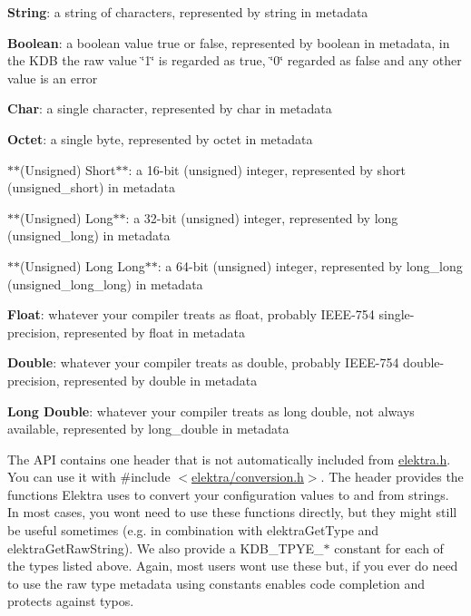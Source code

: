 \begin{DoxyItemize}
\item {\bfseries{String}}\+: a string of characters, represented by {\ttfamily string} in metadata
\item {\bfseries{Boolean}}\+: a boolean value {\ttfamily true} or {\ttfamily false}, represented by {\ttfamily boolean} in metadata, in the K\+DB the raw value {\ttfamily \char`\"{}1\char`\"{}} is regarded as true, {\ttfamily \char`\"{}0\char`\"{}} regarded as false and any other value is an error
\item {\bfseries{Char}}\+: a single character, represented by {\ttfamily char} in metadata
\item {\bfseries{Octet}}\+: a single byte, represented by {\ttfamily octet} in metadata
\item $\ast$$\ast$(Unsigned) Short$\ast$$\ast$\+: a 16-\/bit (unsigned) integer, represented by {\ttfamily short} ({\ttfamily unsigned\+\_\+short}) in metadata
\item $\ast$$\ast$(Unsigned) Long$\ast$$\ast$\+: a 32-\/bit (unsigned) integer, represented by {\ttfamily long} ({\ttfamily unsigned\+\_\+long}) in metadata
\item $\ast$$\ast$(Unsigned) Long Long$\ast$$\ast$\+: a 64-\/bit (unsigned) integer, represented by {\ttfamily long\+\_\+long} ({\ttfamily unsigned\+\_\+long\+\_\+long}) in metadata
\item {\bfseries{Float}}\+: whatever your compiler treats as {\ttfamily float}, probably I\+E\+E\+E-\/754 single-\/precision, represented by {\ttfamily float} in metadata
\item {\bfseries{Double}}\+: whatever your compiler treats as {\ttfamily double}, probably I\+E\+E\+E-\/754 double-\/precision, represented by {\ttfamily double} in metadata
\item {\bfseries{Long Double}}\+: whatever your compiler treats as {\ttfamily long double}, not always available, represented by {\ttfamily long\+\_\+double} in metadata
\end{DoxyItemize}

The A\+PI contains one header that is not automatically included from {\ttfamily \mbox{\hyperlink{elektra_8h}{elektra.\+h}}}. You can use it with {\ttfamily \#include $<$\mbox{\hyperlink{conversion_8h}{elektra/conversion.\+h}}$>$}. The header provides the functions Elektra uses to convert your configuration values to and from strings. In most cases, you won\textquotesingle{}t need to use these functions directly, but they might still be useful sometimes (e.\+g. in combination with {\ttfamily elektra\+Get\+Type} and {\ttfamily elektra\+Get\+Raw\+String}). We also provide a {\ttfamily K\+D\+B\+\_\+\+T\+P\+Y\+E\+\_\+$\ast$} constant for each of the types listed above. Again, most users won\textquotesingle{}t use these but, if you ever do need to use the raw type metadata using constants enables code completion and protects against typos.

